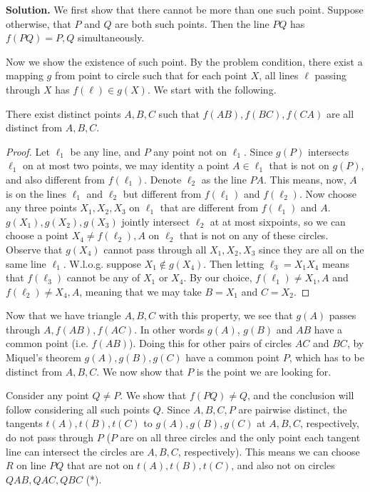 \documentclass[11pt,a4paper]{article}
\begin{document}
\begin{enumerate}
	\textbf{Solution.} 
	We first show that there cannot be more than one such point. 
	Suppose otherwise, that $P$ and $Q$ are both such points. 
	Then the line $PQ$ has $f(PQ)=P, Q$ simultaneously. 
	
	Now we show the existence of such point. 
	By the problem condition, there exist a mapping $g$ from point to circle such that for each point $X$, 
	all lines $\ell$ passing through $X$ has $f(\ell)\in g(X)$. 
	We start with the following. 
	\begin{lemma}
		There exist distinct points $A, B, C$ such that $f(AB), f(BC), f(CA)$ are all distinct from $A, B, C$. 
	\end{lemma}
    
    \begin{proof}
    	Let $\ell_1$ be any line, and $P$ any point not on $\ell_1$. Since $g(P)$ intersects $\ell_1$ on at most two points, we may identity a point $A\in\ell_1$ that is not on $g(P)$, and also different from $f(\ell_1)$. 
    	Denote $\ell_2$ as the line $PA$. 
    	This means, now, $A$ is on the lines $\ell_1$ and $\ell_2$ but different from $f(\ell_1)$ and $f(\ell_2)$. 
    	Now choose any three points $X_1, X_2, X_3$ on $\ell_1$ that are different from $f(\ell_1)$ and $A$. 
    	$g(X_1), g(X_2), g(X_3)$ jointly intersect $\ell_2$ at at most sixpoints, so we can choose a point $X_4\neq f(\ell_2), A$ on $\ell_2$ that is not on any of these circles. 
    	Observe that $g(X_4)$ cannot pass through all $X_1, X_2, X_3$ since they are all on the same line $\ell_1$. 
    	W.l.o.g. suppose $X_1\not\in g(X_4)$. 
    	Then letting $\ell_3=X_1X_4$ means that $f(\ell_3)$ cannot be any of $X_1$ or $X_4$. 
    	By our choice, $f(\ell_1)\neq X_1, A$ and $f(\ell_2)\neq X_4, A$, 
    	meaning that we may take $B=X_1$ and $C=X_2$. 
    \end{proof}
    
    Now that we have triangle $A, B, C$ with this property, 
    we see that $g(A)$ passes through $A, f(AB), f(AC)$. 
    In other words $g(A)$, $g(B)$ and $AB$ have a common point (i.e. $f(AB)$). 
    Doing this for other pairs of circles $AC$ and $BC$, by Miquel's theorem $g(A), g(B), g(C)$ have a common point $P$, 
    which has to be distinct from $A, B, C$. 
    We now show that $P$ is the point we are looking for. 
    
    Consider any point $Q\neq P$. We show that $f(PQ)\neq Q$, and the conclusion will follow considering all such points $Q$. 
    Since $A, B, C, P$ are pairwise distinct, 
    the tangents $t(A), t(B), t(C)$ to $g(A), g(B), g(C)$ at $A, B, C$, respectively, do not pass through $P$ ($P$ are on all three circles and the only point each tangent line can intersect the circles are $A, B, C$, respectively). 
    This means we can choose $R$ on line $PQ$ that are not on $t(A), t(B), t(C)$, 
    and also not on circles $QAB, QAC, QBC$ (*). 
    

\end{enumerate}
\end{document}
